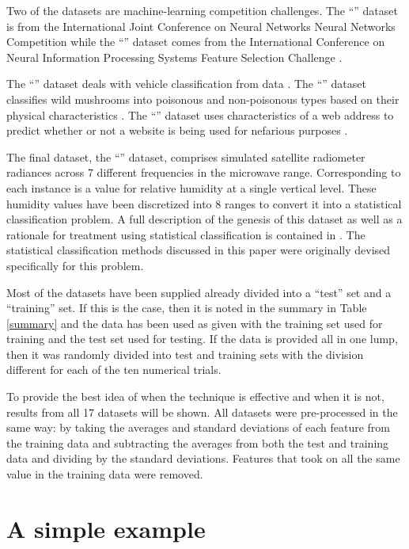 Two of the datasets are machine-learning competition challenges.
The ``'' dataset is from the International Joint Conference on Neural
Networks Neural Networks Competition\citep{Feldkamp_Puskorius1998} while the ``'' dataset comes 
from the International Conference on Neural Information Processing Systems
Feature Selection Challenge \citep{Guyon_etal2004}.

The ``'' dataset deals with vehicle classification from  data
\citep{Duarte_Hu2004}.
The ``'' dataset classifies wild mushrooms
into poisonous and non-poisonous types based on their physical characteristics \citep{Iba_etal1988}.
The ``'' dataset uses characteristics of a web address to predict whether
or not a website is being used for nefarious purposes \citep{Mohommad_etal2014}.

The final dataset, the ``'' dataset, 
comprises simulated satellite radiometer radiances across 7 different frequencies in the microwave range.
Corresponding to each instance is a value for relative humidity at a single
vertical level.
These humidity values have been discretized into 8 ranges to convert it into a statistical classification problem.
A full description of the genesis of this dataset as well as a rationale for
treatment using statistical classification is contained in \citet{Mills2009}.
The statistical classification methods discussed in this paper were originally
devised specifically for this problem.

Most of the datasets have been supplied already divided into a ``test'' set and a ``training'' set.
If this is the case, then it is noted in the summary in Table \ref{summary}
and the data has been used as given with the training set used for training
and the test set used for testing.
If the data is provided all in one lump, then it was randomly divided into 
test and training sets with the division different for each of the ten numerical trials.

To provide the best idea of when the technique is effective and when it is
not, results from all 17 datasets will be shown. 
All datasets were pre-processed in the same way: by taking the averages and
standard deviations of each feature from the training data and subtracting
the averages from both the test and training data and dividing by the 
standard deviations.
Features that took on all the same value in the training data were removed.


\section{A simple example}

